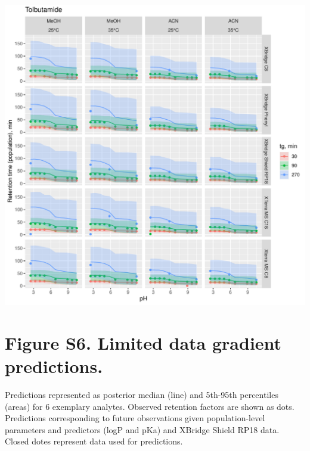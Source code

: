 \documentclass[
]{article}
\begin{document}
\newpage{}

\includegraphics{../figures/concordanceplots/Tolbutamide.population.pdf}

\newpage{}

\hypertarget{figure-s6.-limited-data-gradient-predictions.}{%
\section{Figure S6. Limited data gradient
predictions.}\label{figure-s6.-limited-data-gradient-predictions.}}

Predictions represented as posterior median (line) and 5th-95th
percentiles (areas) for 6 exemplary analytes. Observed retention factors
are shown as dots. Predictions corresponding to future observations
given population-level parameters and predictors (logP and pKa) and
XBridge Shield RP18 data. Closed dotes represent data used for
predictions.
\end{document}
